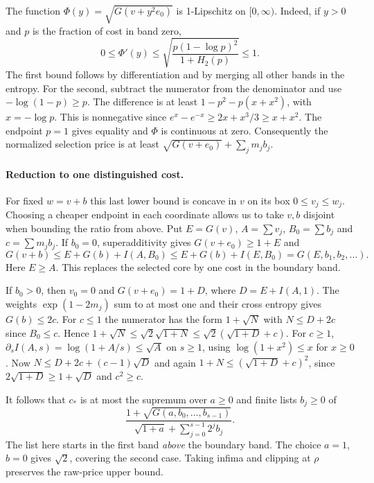 The function $\Phi(y)=\sqrt{G(v+y^2e_0)}$ is 1-Lipschitz on $[0,\infty)$.
Indeed, if $y>0$ and $p$ is the fraction of cost in band zero,
\[
 0\le\Phi'(y)\le
 \sqrt{\frac{p(1-\log p)^2}{1+H_2(p)}}\le1.
\]
The first bound follows by differentiation and by merging all other
bands in the entropy. For the second, subtract the numerator from the
denominator and use $-\log(1-p)\ge p$. The difference is at least
$1-p^2-p(x+x^2)$, with $x=-\log p$. This is nonnegative since
$e^x-e^{-x}\ge2x+x^3/3\ge x+x^2$. The endpoint $p=1$ gives equality
and $\Phi$ is continuous at zero. Consequently the normalized selection
price is at least $\sqrt{G(v+e_0)}+\sum_jm_jb_j$.

\paragraph{Reduction to one distinguished cost.}
For fixed $w=v+b$ this last lower bound is concave in $v$ on its box
$0\le v_j\le w_j$. Choosing a cheaper endpoint in each coordinate allows
us to take $v,b$ disjoint when bounding the ratio from above. Put
$E=G(v)$, $A=\sum v_j$, $B_0=\sum b_j$ and $c=\sum m_jb_j$.
If $b_0=0$, superadditivity gives $G(v+e_0)\ge1+E$ and
\[
 G(v+b)\le E+G(b)+I(A,B_0)\le E+G(b)+I(E,B_0)=G(E,b_1,b_2,\ldots).
\]
Here $E\ge A$. This replaces the selected core by one cost in the boundary band.

If $b_0>0$, then $v_0=0$ and $G(v+e_0)=1+D$, where $D=E+I(A,1)$.
The weights $\exp(1-2m_j)$ sum to at most one and their cross entropy
gives $G(b)\le2c$. For $c\le1$ the numerator
has the form $1+\sqrt N$ with $N\le D+2c$ since $B_0\le c$. Hence
$1+\sqrt N\le\sqrt2\sqrt{1+N}\le\sqrt2(\sqrt{1+D}+c)$.
For $c\ge1$, $\partial_s I(A,s)=\log(1+A/s)\le\sqrt A$ on $s\ge1$,
using $\log(1+x^2)\le x$ for $x\ge0$. Now
$N\le D+2c+(c-1)\sqrt D$ and again $1+N\le(\sqrt{1+D}+c)^2$, since
$2\sqrt{1+D}\ge1+\sqrt D$ and $c^2\ge c$.

It follows that $c_*$ is at most the supremum over $a\ge0$ and finite
lists $b_j\ge0$ of
\begin{equation}\label{eq:sharp-quantile-reduced}
 \frac{1+\sqrt{G(a,b_0,\ldots,b_{s-1})}}
      {\sqrt{1+a}+\sum_{j=0}^{s-1}2^jb_j}.
\end{equation}
The list here starts in the first band \emph{above} the boundary band.
The choice $a=1$, $b=0$ gives $\sqrt2$, covering the second case.
Taking infima and clipping at $\rho$ preserves the raw-price upper bound.

